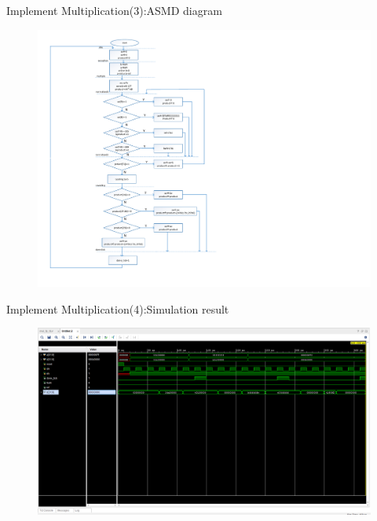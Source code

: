\documentclass[11pt]{beamer}
\begin{document}
\begin{frame}[t]{Implement Multiplication(3):ASMD diagram}
\begin{center}
    \begin{figure}[htp]
    \begin{center}
     \includegraphics[scale=.37]{image/asmdmul}
    \end{center}
    \label{refasmdmul}
    \end{figure}
\end{center}
\end{frame}
\begin{frame}[t]{Implement Multiplication(4):Simulation result}
\begin{center}
    \begin{figure}[htp]
    \begin{center}
     \includegraphics[scale=.25]{image/fig18}
    \end{center}
    \label{reffig18}
    \end{figure}
\end{center}
\end{frame}
\end{document}
